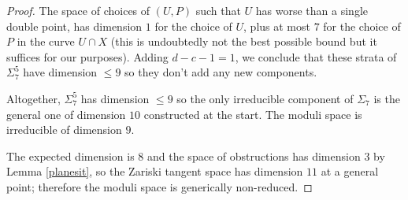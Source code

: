 \documentclass{amsart}
\theoremstyle{plain}
\numberwithin{equation}{section}
\begin{document}
\begin{proof}
The space of choices of $(U,P)$ such that $U$ has worse than a single double point,
has dimension $1$ for the choice of $U$, plus at most $7$ for the choice of $P$
in the curve $U\cap X$ (this is undoubtedly not the best possible bound but it suffices for
our purposes). Adding $d-c-1=1$, we conclude that these strata of $\Sigma ^5_7$ have
dimension $\leq 9$ so they don't add any new components.

Altogether, $\Sigma ^5_7$ has dimension $\leq 9$ so the only irreducible component of $\Sigma _7$ is the general one of dimension $10$ constructed at the start. The moduli space
is irreducible of dimension $9$. 

The expected dimension is $8$ and the space of obstructions has dimension $3$ by
Lemma \ref{planesit}, so the Zariski tangent space has dimension $11$ at a general point;
therefore the  moduli space is generically non-reduced. 
\end{proof}
\end{document}
